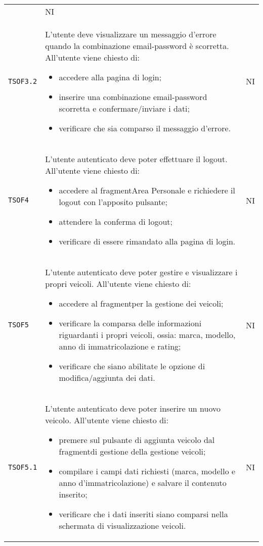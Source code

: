 \begin{longtable}{ >{\centering}p{} >{\centering}p{}
			>{\centering}p{}}
\begin{itemize}
		 \end{itemize}  &	NI	\tabularnewline
		 \texttt{TSOF3.2}	&	L'utente deve visualizzare un messaggio d'errore quando la combinazione email-password è scorretta. All'utente viene chiesto di:
		 \begin{itemize}
		 	\item accedere alla pagina di login;
		 	\item inserire una combinazione email-password scorretta e confermare/inviare i dati;
		 	\item verificare che sia comparso il messaggio d'errore.
		 \end{itemize}  &	NI	\tabularnewline
		 \texttt{TSOF4}	&	L'utente autenticato deve poter effettuare il logout. All'utente viene chiesto di:
		 \begin{itemize}
		 	\item accedere al fragment\glosp Area Personale e richiedere il logout con l'apposito pulsante;
		 	\item attendere la conferma di logout;
		 	\item verificare di essere rimandato alla pagina di login.
		 \end{itemize}  &	NI	\tabularnewline
		 \texttt{TSOF5}	&	L'utente autenticato deve poter gestire e visualizzare i propri veicoli. 
		 All'utente viene chiesto di:
		 \begin{itemize}
		 	\item accedere al fragment\glosp per la gestione dei veicoli;
		 	\item verificare la comparsa delle informazioni riguardanti i propri veicoli, ossia: marca, modello, anno di immatricolazione e rating;
		 	\item verificare che siano abilitate le opzione di modifica/aggiunta dei dati. 
		 \end{itemize}	&	NI	\tabularnewline
		 \texttt{TSOF5.1}	&	L'utente autenticato deve poter inserire un nuovo veicolo. All'utente viene chiesto di:
		 \begin{itemize}
		 	\item premere sul pulsante di aggiunta veicolo dal fragment\glosp di gestione della gestione veicoli;
		 	\item compilare i campi dati richiesti (marca, modello e anno d'immatricolazione) e salvare il contenuto inserito;
		 	\item verificare che i dati inseriti siano comparsi nella schermata di visualizzazione veicoli.
		 \end{itemize}	&	NI	\tabularnewline

\end{longtable}
